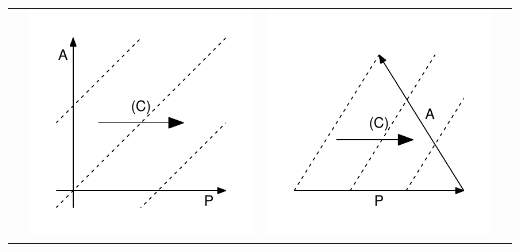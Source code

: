 \documentclass[12pt,oneside,letter]{article} %
\begin{document}
\begin{center}
\begin{longtable}{m{}m{}m{}m{}}
  & \includegraphics[width = \linewidth]{Figures/JonasTable/APc.pdf} & \includegraphics[width = \linewidth]{Figures/JonasTable/APc_iso.pdf}  \\

\end{longtable}
\end{center}
\end{document}
